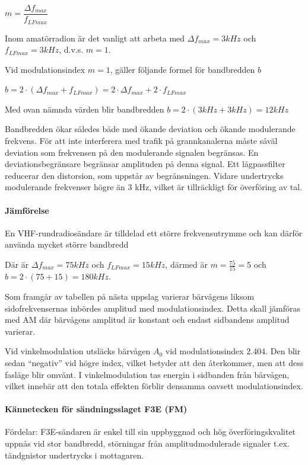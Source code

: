 \(m = \dfrac{\Delta f_{max}}{f_{LFmax}}\)

Inom amatörradion är det vanligt att arbeta med \(\Delta f_{max} = 3 kHz\) och
\(f_{LFmax} = 3 kHz\), d.v.s. \(m = 1\).

Vid modulationsindex \(m = 1\), gäller följande
formel för bandbredden \(b\)

\(b = 2 \cdot ( \Delta f_{max} + f_{LFmax}) = 2 \cdot \Delta f_{max}
 + 2 \cdot f_{LFmax}\)

Med ovan nämnda värden blir bandbredden \(b = 2 \cdot (3 kHz + 3 kHz)
 = 12 kHz\)

Bandbredden ökar således både med ökande deviation och ökande modulerande
frekvens. För att inte interferera med trafik på grannkanalerna måste såväl
deviation som frekvensen på den modulerande signalen begränsas. En
deviationsbegränsare begränsar amplituden på denna signal. Ett lågpassfilter
reducerar den distorsion, som uppstår av begränsningen. Vidare undertrycks
modulerande frekvenser högre än 3 kHz, vilket är tillräckligt för överföring
av tal.

\paragraph{Jämförelse}

En VHF-rundradiosändare är tilldelad ett större frekvensutrymme och kan därför
använda mycket större bandbredd

Där är \(\Delta f_{max} = 75 kHz\) och \(f_{LFmax} =15 kHz\), därmed är
\(m = \frac{75}{15} = 5\) och \(b = 2 \cdot (75 + 15) = 180 kHz\).

Som framgår av tabellen på nästa uppslag varierar bärvågens liksom
sidofrekvensernas inbördes amplitud med modulationsindex. Detta skall jämföras
med AM där bärvågens amplitud är konstant och endast sidbandens amplitud
varierar.

Vid vinkelmodulation utsläcks bärvågen \(A_0\) vid modulationsindex 2.404. Den
blir sedan ``negativ'' vid högre index, vilket betyder att den återkommer, men
att dess fasläge blir omvänt. I vinkelmodulation tas energin i sidbanden från
bärvågen, vilket innebär att den totala effekten förblir densamma oavsett
modulationsindex.

\paragraph{Kännetecken för sändningsslaget F3E (FM)}

Fördelar: F3E-sändaren är enkel till sin uppbyggnad och hög överföringskvalitet
uppnås vid stor bandbredd, störningar från amplitudmodulerade signaler t.ex.
tändgnistor undertrycks i mottagaren.

